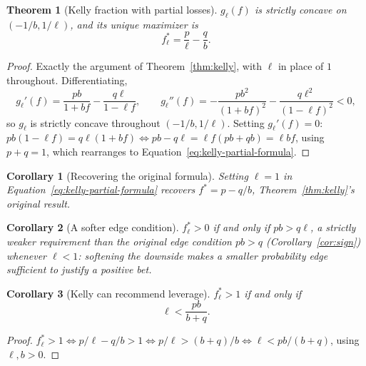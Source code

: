 \documentclass[11pt]{article}
\newtheorem{theorem}{Theorem}
\newtheorem{corollary}{Corollary}
\theoremstyle{remark}
\theoremstyle{definition}
\begin{document}
\begin{theorem}[Kelly fraction with partial losses]
\label{thm:kelly-partial}
$g_\ell(f)$ is strictly concave on $(-1/b, 1/\ell)$, and its unique maximizer is
\begin{equation}
f_\ell^{*} = \frac{p}{\ell} - \frac{q}{b}.
\label{eq:kelly-partial-formula}
\end{equation}
\end{theorem}
\begin{proof}
Exactly the argument of Theorem~\ref{thm:kelly}, with $\ell$ in place of $1$ throughout. Differentiating,
\begin{equation*}
g_\ell'(f) = \frac{pb}{1+bf} - \frac{q\ell}{1-\ell f}, \qquad
g_\ell''(f) = -\frac{pb^2}{(1+bf)^2} - \frac{q\ell^2}{(1-\ell f)^2} < 0,
\end{equation*}
so $g_\ell$ is strictly concave throughout $(-1/b,1/\ell)$. Setting $g_\ell'(f)=0$: $pb(1-\ell f) = q\ell(1+bf) \iff pb - q\ell = \ell f (pb+qb) = \ell b f$, using $p+q=1$, which rearranges to Equation~\eqref{eq:kelly-partial-formula}.
\end{proof}

\begin{corollary}[Recovering the original formula]
Setting $\ell=1$ in Equation~\eqref{eq:kelly-partial-formula} recovers $f^{*}=p-q/b$, Theorem~\ref{thm:kelly}'s original result.
\end{corollary}

\begin{corollary}[A softer edge condition]
\label{cor:partial-edge}
$f_\ell^{*}>0$ if and only if $pb>q\ell$, a strictly weaker requirement than the original edge condition $pb>q$ (Corollary~\ref{cor:sign}) whenever $\ell<1$: softening the downside makes a smaller probability edge sufficient to justify a positive bet.
\end{corollary}

\begin{corollary}[Kelly can recommend leverage]
\label{cor:partial-leverage}
$f_\ell^{*}>1$ if and only if
\begin{equation}
\ell < \frac{pb}{b+q}.
\label{eq:leverage-threshold}
\end{equation}
\end{corollary}
\begin{proof}
$f_\ell^*>1 \iff p/\ell - q/b > 1 \iff p/\ell > (b+q)/b \iff \ell < pb/(b+q)$, using $\ell,b>0$.
\end{proof}
\end{document}
